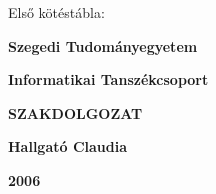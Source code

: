 \documentclass[12pt]{report}
\begin{document}
\thispagestyle{empty}
Első kötéstábla:

\begin{center}
{\Large\bf Szegedi Tudományegyetem}

\vspace{0.5cm}

{\Large\bf Informatikai Tanszékcsoport}

\vspace*{8.5cm}


{\Huge\bf SZAKDOLGOZAT}


\vspace*{7cm}

{\LARGE\bf Hallgató Claudia}

\vspace*{0.6cm}

{\Large\bf 2006}

\end{center}
\end{document}
